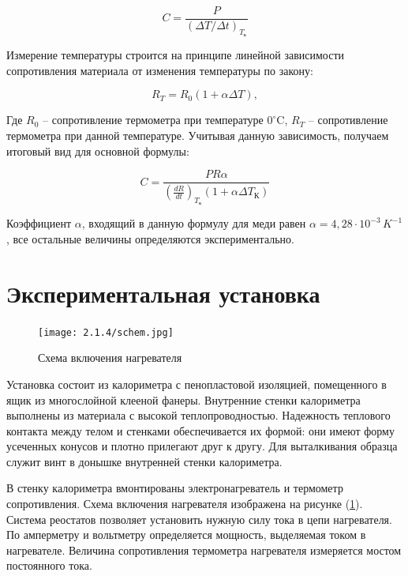 \documentclass[a4paper,12pt]{article} %
\begin{document}
\begin{equation}
	C = \frac{P}{\left( \Delta T / \Delta t \right)_{T_{\text{к}}}}
	\label{eq:final_eq_for_capacity}
\end{equation}

Измерение температуры строится на принципе линейной зависимости сопротивления материала от изменения температуры по закону:

\begin{equation}
	R_{T} = R_{0} \left( 1 + \alpha \Delta T \right),
\end{equation}

Где $R_{0}$ -- сопротивление термометра при температуре $0^\circ$C, $R_{T}$ -- сопротивление термометра при данной температуре. Учитывая данную зависимость, получаем итоговый вид для основной формулы:

\begin{equation}
	C = \frac{PR\alpha}{\left( \frac{dR}{dt} \right)_{T_{\text{к}}}\left( 1 + \alpha \Delta T_{\text{К}} \right)}
	\label{eq:capacity}
\end{equation}	 

Коэффициент $\alpha$, входящий в данную формулу для меди равен $\alpha = 4,28 \cdot 10^{-3} \, K^{-1}$, все остальные величины определяются экспериментально.
	
\section{Экспериментальная установка}
\begin{figure}
\vspace{-2.5ex}
	\begin{center}
		\texttt{[image: 2.1.4/schem.jpg]}
		\caption{Схема включения нагревателя}
		\label{fig:schem_of_facility}
	\end{center}
\end{figure}

Установка состоит из калориметра с пенопластовой изоляцией, помещенного в ящик из многослойной клееной фанеры. Внутренние стенки калориметра выполнены из материала с высокой теплопроводностью. Надежность теплового контакта между телом и стенками обеспечивается их формой: они имеют форму усеченных конусов и плотно прилегают друг к другу. Для выталкивания образца служит винт в донышке внутренней стенки калориметра.

В стенку калориметра вмонтированы электронагреватель и термометр сопротивления. Схема включения нагревателя изображена на рисунке (\ref{fig:schem_of_facility}). Система реостатов позволяет установить нужную силу тока в цепи нагревателя. По амперметру и вольтметру определяется мощность, выделяемая током в нагревателе. Величина сопротивления термометра нагревателя  измеряется мостом постоянного тока.
\end{document}
